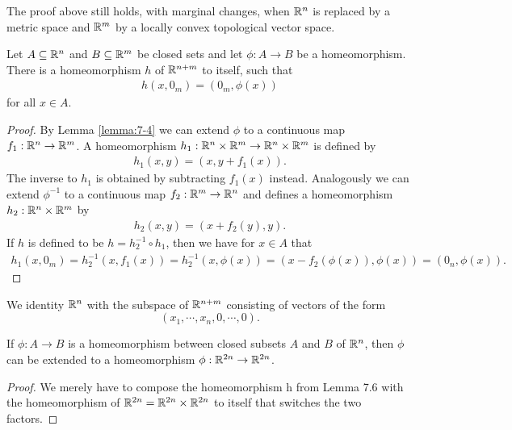 \begin{remark}\label{remark:7-5}
  The proof above still holds, with marginal changes, when $\mathbb{R}^n$ is
  replaced by a metric space and $\mathbb{R}^m$ by a locally convex topological vector space.
\end{remark}

\begin{lemma}\label{lemma:7-6}
  Let $A\subseteq\mathbb{R}^n$ and $B\subseteq\mathbb{R}^m$ be closed sets and let $\phi:A\to B$ be a 
  homeomorphism. There is a homeomorphism $h$ of $\mathbb{R}^{n+m}$ to itself, such that 
  \begin{align*}
    h(x, 0_m) = (0_m, \phi(x))
  \end{align*}
  for all $x\in A$.
\end{lemma}

\begin{proof}
  By Lemma \ref{lemma:7-4} we can extend $\phi$ to a continuous map $f_1:\mathbb{R}^n\to\mathbb{R}^m$. A 
  homeomorphism $h_1:\mathbb{R}^n\times\mathbb{R}^m\to\mathbb{R}^n\times\mathbb{R}^m$ is defined by 
  \begin{align*}
    h_1(x, y) = (x, y+f_1(x)).
  \end{align*} 
  The inverse to $h_1$ is obtained by subtracting $f_1(x)$ instead. Analogously we can 
  extend $\phi^{-1}$ to a continuous map $f_2:\mathbb{R}^m\to\mathbb{R}^n$ and defines a homeomorphism
  $h_2:\mathbb{R}^n\times\mathbb{R}^m$ by 
  \begin{align*}
    h_2(x, y) = (x+f_2(y), y).
  \end{align*}
  If $h$ is defined to be $h=h_2^{-1}\circ h_1$, then we have for $x\in A$ that 
  \begin{align*}
    h_1(x, 0_m) 
    = h_2^{-1}(x, f_1(x))
    = h_2^{-1}(x, \phi(x))
    = (x-f_2(\phi(x)), \phi(x))
    = (0_n,  \phi(x)).
  \end{align*}
\end{proof}

We identity $\mathbb{R}^n$ with the subspace of $\mathbb{R}^{n+m}$ consisting of vectors of the form 
\[(x_1, \cdots, x_n, 0, \cdots, 0).\]

\begin{corollary}\label{corollary:7-7}
  If $\phi:A\to B$ is a homeomorphism between closed subsets $A$ and $B$
  of $\mathbb{R}^n$, then $\phi$ can be extended to a homeomorphism $\phi:\mathbb{R}^{2n}\to\mathbb{R}^{2n}$.
\end{corollary}

\begin{proof}
  We merely have to compose the homeomorphism h from Lemma 7.6 with
the homeomorphism of $\mathbb{R}^{2n} = \mathbb{R}^{2n}\times\mathbb{R}^{2n}$ to itself that switches the two 
factors.
\end{proof}

